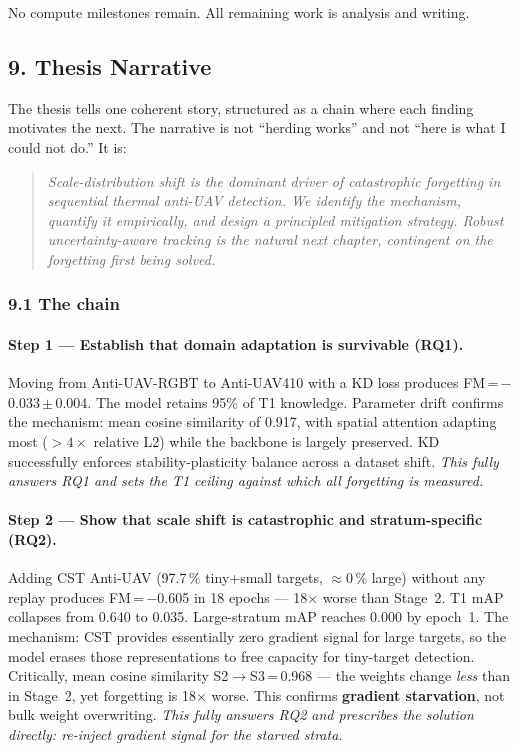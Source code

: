 \noindent No compute milestones remain. All remaining work is analysis
and writing.

\subsection*{9. Thesis Narrative}

The thesis tells one coherent story, structured as a chain where each
finding motivates the next. The narrative is not ``herding works'' and
not ``here is what I could not do.'' It is:

\begin{quote}
\textit{Scale-distribution shift is the dominant driver of catastrophic
forgetting in sequential thermal anti-UAV detection. We identify the
mechanism, quantify it empirically, and design a principled mitigation
strategy. Robust uncertainty-aware tracking is the natural next chapter,
contingent on the forgetting first being solved.}
\end{quote}

\subsubsection*{9.1 The chain}

\paragraph{Step 1 — Establish that domain adaptation is survivable (RQ1).}
Moving from Anti-UAV-RGBT to Anti-UAV410 with a KD loss produces
FM\,=\,$-$0.033\,$\pm$\,0.004. The model retains 95\% of T1 knowledge.
Parameter drift confirms the mechanism: mean cosine similarity of 0.917,
with spatial attention adapting most ($>4\times$ relative L2) while the
backbone is largely preserved. KD successfully enforces
stability-plasticity balance across a dataset shift. \textit{This
fully answers RQ1 and sets the T1 ceiling against which all forgetting is
measured.}

\paragraph{Step 2 — Show that scale shift is catastrophic and stratum-specific (RQ2).}
Adding CST Anti-UAV (97.7\,\% tiny+small targets, $\approx$0\,\% large)
without any replay produces FM\,=\,$-$0.605 in 18 epochs — 18$\times$
worse than Stage~2. T1 mAP collapses from 0.640 to 0.035. Large-stratum
mAP reaches 0.000 by epoch~1. The mechanism: CST provides essentially
zero gradient signal for large targets, so the model erases those
representations to free capacity for tiny-target detection. Critically,
mean cosine similarity S2$\to$S3\,=\,0.968 — the weights change
\textit{less} than in Stage~2, yet forgetting is 18$\times$ worse.
This confirms \textbf{gradient starvation}, not bulk weight overwriting.
\textit{This fully answers RQ2 and prescribes the solution directly:
re-inject gradient signal for the starved strata.}

